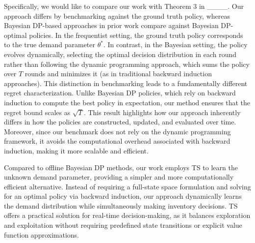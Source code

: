 Specifically, we would like to compare our work with Theorem 3 in ____. Our approach differs by benchmarking against the ground truth policy, whereas Bayesian DP-based approaches in prior work compare against Bayesian DP-optimal policies. In the frequentist setting, the ground truth policy corresponds to the true demand parameter \( \theta^* \). In contrast, in the Bayesian setting, the policy evolves dynamically, selecting the optimal decision distribution in each round rather than following the dynamic programming approach, which sums the policy over \(T\) rounds and minimizes it (as in traditional backward induction approaches). This distinction in benchmarking leads to a fundamentally different regret characterization. Unlike Bayesian DP policies, which rely on backward induction to compute the best policy in expectation, our method ensures that the regret bound scales as \( \sqrt{T} \). This result highlights how our approach inherently differs in how the policies are constructed, updated, and evaluated over time. Moreover, since our benchmark does not rely on the dynamic programming framework, it avoids the computational overhead associated with backward induction, making it more scalable and efficient.

Compared to offline Bayesian DP methods, our work employs TS to learn the unknown demand parameter, providing a simpler and more computationally efficient alternative. Instead of requiring a full-state space formulation and solving for an optimal policy via backward induction, our approach dynamically learns the demand distribution while simultaneously making inventory decisions. TS offers a practical solution for real-time decision-making, as it balances exploration and exploitation without requiring predefined state transitions or explicit value function approximations. %


